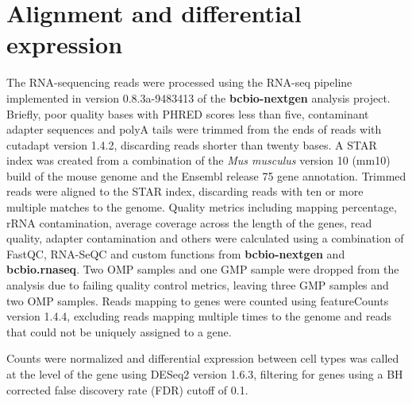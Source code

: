 \documentclass{article}
\begin{document}
\section*{Alignment and differential expression}
The RNA-sequencing reads were processed using the RNA-seq pipeline implemented
in version 0.8.3a-9483413 of the \textbf{bcbio-nextgen} analysis project.
Briefly, poor quality bases with PHRED scores less than
five\cite{Macmanes:2014ha}, contaminant adapter sequences and polyA tails were
trimmed from the ends of reads with cutadapt\cite{Martin:2011va} version 1.4.2,
discarding reads shorter than twenty bases. A STAR\cite{Dobin:2013fg} index was
created from a combination of the \emph{Mus musculus} version 10 (mm10) build of
the mouse genome and the Ensembl release 75 gene annotation. Trimmed reads were
aligned to the STAR index, discarding reads with ten or more multiple matches to
the genome. Quality metrics including mapping percentage, rRNA contamination,
average coverage across the length of the genes, read quality, adapter
contamination and others were calculated using a combination of FastQC,
RNA-SeQC\cite{DeLuca:2012dp} and custom functions from \textbf{bcbio-nextgen}
and \textbf{bcbio.rnaseq}. Two OMP samples and one GMP sample were dropped from
the analysis due to failing quality control metrics, leaving three GMP samples
and two OMP samples. Reads mapping to genes were counted using
featureCounts\cite{Liao:2014cj}
version 1.4.4, excluding reads mapping
multiple times to the genome and reads that could not be uniquely assigned to a
gene.

Counts were normalized and differential expression between cell types was called
at the level of the gene using DESeq2\cite{Love:2014vr} version 1.6.3, filtering
for genes using a BH corrected\cite{Benjamini:1995p1395} false discovery rate
(FDR) cutoff of 0.1.

\clearpage


\end{document}
